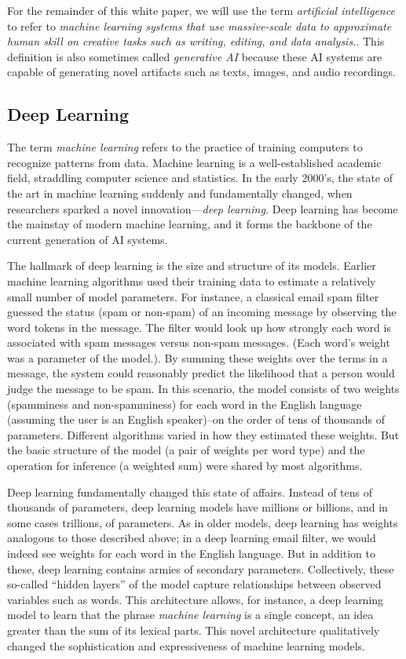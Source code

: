 \documentclass[12pt, oneside]{article}   	%
\begin{document}
For the remainder of this white paper, we will use the term \emph{artificial intelligence} to refer to \emph{machine learning systems that use massive-scale data to approximate human skill on creative tasks such as writing, editing, and data analysis.}.   This definition is also sometimes called \emph{generative AI} because these AI systems are capable of generating novel artifacts such as texts, images, and audio recordings.


\subsection{Deep Learning}\label{section.definitions.deep-learning}
The term \emph{machine learning} refers to the practice of training computers to recognize patterns from data.  Machine learning is a well-established academic field, straddling computer science and statistics.  In the early 2000’s, the state of the art in machine learning suddenly and fundamentally changed, when researchers sparked a novel innovation—\emph{deep learning.}  Deep learning has become the mainstay of modern machine learning, and it forms the backbone of the current generation of AI systems.

The hallmark of deep learning is the size and structure of its models.  Earlier machine learning algorithms used their training data to estimate a relatively small number of model parameters.  For instance, a classical email spam filter guessed the status (spam or non-spam) of an incoming message by observing the word tokens in the message.  The filter would look up how strongly each word is associated with spam messages versus non-spam messages.  (Each word's weight was a parameter of the model.). By summing these weights over the terms in a message, the system could reasonably predict the likelihood that a person would judge the message to be spam.  In this scenario, the model consists of two weights (spamminess and non-spamminess) for each word in the English language (assuming the user is an English speaker)--on the order of tens of thousands of parameters.  Different algorithms varied in how they estimated these weights.  But the basic structure of the model (a pair of weights per word type) and the operation for inference (a weighted sum) were shared by most algorithms.

Deep learning fundamentally changed this state of affairs.  Instead of tens of thousands of parameters, deep learning models have millions or billions, and in some cases trillions, of parameters.  As in older models, deep learning has weights analogous to those described above; in a deep learning email filter, we would indeed see weights for each word in the English language.  But in addition to these, deep learning contains armies of secondary parameters.  Collectively, these so-called “hidden layers” of the model capture relationships between observed variables such as words.  This architecture allows, for instance, a deep learning model to learn that the phrase \emph{machine learning} is a single concept, an idea greater than the sum of its lexical parts.  This novel architecture qualitatively changed the sophistication and expressiveness of machine learning models.
\end{document}
